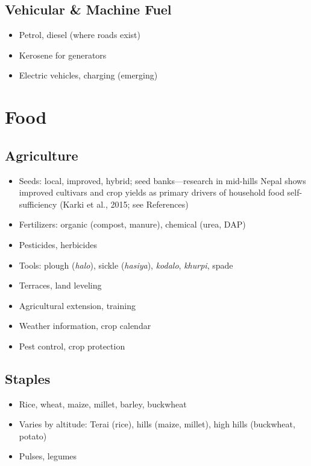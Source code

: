 \documentclass[11pt,a4paper]{article}
\begin{document}
\subsection{Vehicular \& Machine Fuel}
\begin{itemize}
    \item Petrol, diesel (where roads exist)
    \item Kerosene for generators
    \item Electric vehicles, charging (emerging)
\end{itemize}

\section{Food}

\subsection{Agriculture}
\begin{itemize}
    \item Seeds: local, improved, hybrid; seed banks---research in mid-hills Nepal shows improved cultivars and crop yields as primary drivers of household food self-sufficiency (Karki et al., 2015; see References)
    \item Fertilizers: organic (compost, manure), chemical (urea, DAP)
    \item Pesticides, herbicides
    \item Tools: plough (\textit{halo}), sickle (\textit{hasiya}), \textit{kodalo}, \textit{khurpi}, spade
    \item Terraces, land leveling
    \item Agricultural extension, training
    \item Weather information, crop calendar
    \item Pest control, crop protection
\end{itemize}

\subsection{Staples}
\begin{itemize}
    \item Rice, wheat, maize, millet, barley, buckwheat
    \item Varies by altitude: Terai (rice), hills (maize, millet), high hills (buckwheat, potato)
    \item Pulses, legumes
\end{itemize}
\end{document}
